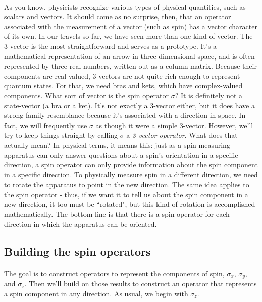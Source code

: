 \documentclass[a4paper,10pt]{article}
\begin{document}
\paragraph{} As you know, physicists recognize various types of physical quantities, such as scalars and vectors. It should come as no surprise, then, that an operator associated with the measurement of a vector (such as spin) has a vector character of its own. In our travels so far, we have seen more than one kind of vector. The 3-vector is the most straightforward and serves as a prototype. It's a mathematical representation of an arrow in three-dimensional space, and is often represented by three real numbers, written out as a column matrix. Because their components are real-valued, 3-vectors are not quite rich enough to represent quantum states. For that, we need bras and kets, which have complex-valued components. What sort of vector is the spin operator $\sigma$? It is definitely not a state-vector (a bra or a ket). It's not exactly a 3-vector either, but it does have a strong family resemblance because it's associated with a direction in space. In fact, we will frequently use $\sigma$ as though it were a simple 3-vector. However, we'll try to keep things straight by calling $\sigma$ a \textit{3-vector operator}. What does that actually mean? In physical terms, it means this: just as a spin-measuring apparatus can only answer questions about a spin's orientation in a specific direction, a spin operator can only provide information about the spin component in a specific direction. To physically measure spin in a different direction, we need to rotate the apparatus to point in the new direction. The same idea applies to the spin operator - thus, if we want it to tell us about the spin component in a new direction, it too must be ``rotated", but this kind of rotation is accomplished mathematically. The bottom line is that there is a spin operator for each direction in which the apparatus can be oriented.

\subsection{Building the spin operators}

\paragraph{} The goal is to construct operators to represent the components of spin, $\sigma_x$, $\sigma_y$, and $\sigma_z$. Then we'll build on those results to construct an operator that represents a spin component in any direction. As usual, we begin with $\sigma_z$.
\end{document}
